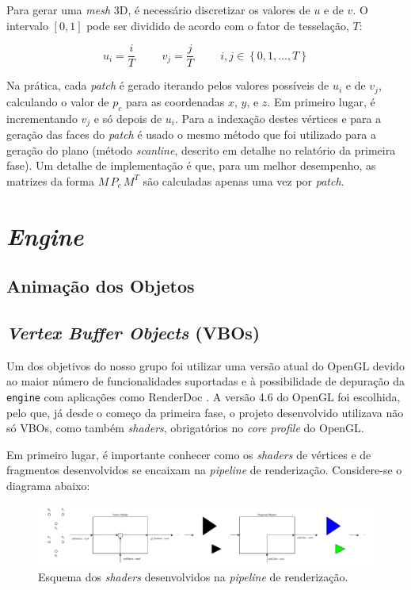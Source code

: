 \documentclass[12pt, a4paper]{article}
\begin{document}
Para gerar uma \emph{mesh} 3D, é necessário discretizar os valores de $u$ e de $v$. O intervalo
$\left [ 0, 1 \right ]$ pode ser dividido de acordo com o fator de tesselação, $T$:

$$
u_i = \frac{i}{T}
\hspace{1cm}
v_j = \frac{j}{T}
\hspace{1cm}
i, j \in \left \lbrace 0, 1, \ldots, T \right \rbrace
$$

Na prática, cada \emph{patch} é gerado iterando pelos valores possíveis de $u_i$ e de $v_j$,
calculando o valor de $p_c$ para as coordenadas $x$, $y$, e $z$. Em primeiro lugar, é incrementando
$v_j$ e só depois de $u_i$. Para a indexação destes vértices e para a geração das faces do
\emph{patch} é usado o mesmo método que foi utilizado para a geração do plano (método
\emph{scanline}, descrito em detalhe no relatório da primeira fase). Um detalhe de implementação é
que, para um melhor desempenho, as matrizes da forma $M \, P_c \, M^T$ são calculadas apenas uma vez
por \emph{patch}.

\section{\emph{Engine}}

\subsection{Animação dos Objetos}

\subsection{\emph{Vertex Buffer Objects} (VBOs)}

Um dos objetivos do nosso grupo foi utilizar uma versão atual do OpenGL devido ao maior número de
funcionalidades suportadas e à possibilidade de depuração da \texttt{engine} com aplicações como
RenderDoc \cite{renderdoc}. A versão 4.6 do OpenGL foi escolhida, pelo que, já desde o começo da
primeira fase, o projeto desenvolvido utilizava não só VBOs, como também \emph{shaders},
obrigatórios no \emph{core profile} do OpenGL.

Em primeiro lugar, é importante conhecer como os \emph{shaders} de vértices e de fragmentos
desenvolvidos se encaixam na \emph{pipeline} de renderização. Considere-se o diagrama abaixo:

\begin{figure}[H]
    \centering
    \includegraphics[width=\textwidth]{res/phase3/Shaders.pdf}
    \caption{Esquema dos \emph{shaders} desenvolvidos na \emph{pipeline} de renderização.}
\end{figure}
\end{document}
